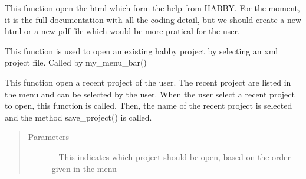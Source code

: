 \documentclass[letterpaper,10pt,english]{sphinxmanual}
\begin{document}
\begin{fulllineitems}
\begin{fulllineitems}
\begin{quote}
\begin{description}
\end{description}\end{quote}

\end{fulllineitems}


\begin{fulllineitems}
\label{\detokenize{index:src_GUI.Main_windows_1.MainWindows.open_help}}
This function open the html which form the help from HABBY. For the moment, it is the full documentation
with all the coding detail, but we should create a new html or a new pdf file which would be more pratical
for the user.

\end{fulllineitems}


\begin{fulllineitems}
\label{\detokenize{index:src_GUI.Main_windows_1.MainWindows.open_project}}
This function is used to open an existing habby project by selecting an xml project file. Called by
my\_menu\_bar()

\end{fulllineitems}


\begin{fulllineitems}
\label{\detokenize{index:src_GUI.Main_windows_1.MainWindows.open_recent_project}}
This function open a recent project of the user. The recent project are listed in the menu and can be
selected by the user. When the user select a recent project to open, this function is called. Then, the name of
the recent project is selected and the method save\_project() is called.
\begin{quote}\begin{description}
\item[{Parameters}] \leavevmode
{} -- This indicates which project should be open, based on the order given in the menu

\end{description}\end{quote}


\end{fulllineitems}
\end{fulllineitems}
\end{document}
